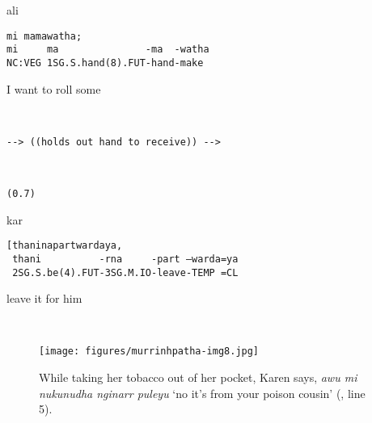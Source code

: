 \documentclass[output=paper,nonflat,colorlinks,citecolor=brown]{langsci/langscibook}
\begin{document}
%
\begin{mdframednoverticalspace}[style=firstfoc]
\begin{transbox}{7}{ali}
\begin{verbatim}
mi mamawatha;
mi     ma               -ma  -watha
NC:VEG 1SG.S.hand(8).FUT-hand-make
\end{verbatim}
I want to roll some
\end{transbox}
\end{mdframednoverticalspace}
\begin{mdframednoverticalspace}[style=firstfoc]
\begin{transbox}{8}{~}
\begin{verbatim}
--> ((holds out hand to receive)) -->
\end{verbatim}
\end{transbox}
\end{mdframednoverticalspace}
%
\begin{transbox}{9}{~}
\begin{verbatim}
(0.7)
\end{verbatim}
\end{transbox}
%
\begin{mdframednoverticalspace}[style=secondfoc]
\begin{transbox}{10}{kar}
\begin{verbatim}
[thaninapartwardaya,
 thani          -rna     -part –warda=ya
 2SG.S.be(4).FUT-3SG.M.IO-leave-TEMP =CL
\end{verbatim}
\hspace{0.07cm} leave it for him
\end{transbox}
\end{mdframednoverticalspace}
\emptytransbox{11}{[((Karen looks into tobacco tin, Alice holds out hand))}\\

\begin{figure}
\texttt{[image: figures/murrinhpatha-img8.jpg]}
\caption{
While taking her tobacco out of her pocket, Karen says, \textit{awu mi nukunudha nginarr puleyu} ‘no it’s from your poison cousin’ (, line 5).
\label{fig:blythe:8}}\end{figure}
\end{document}
